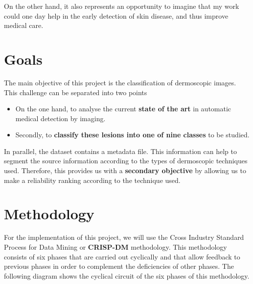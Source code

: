 On the other hand, it also represents an opportunity to imagine that my work could one day help in the early detection of skin disease, and thus improve medical care.



\section{Goals}


The main objective of this project is the classification of dermoscopic images. This challenge can be separated into two points

\begin{itemize}
    \item On the one hand, to analyse the current \textbf{state of the art} in automatic medical detection by imaging.
    \item Secondly, to \textbf{classify these lesions into one of nine classes} to be studied.
\end{itemize}

In parallel, the dataset contains a metadata file. This information can help to segment the source information according to the types of dermoscopic techniques used. Therefore, this provides us with a \textbf{secondary objective} by allowing us to make a reliability ranking according to the technique used. 


\section{Methodology}


For the implementation of this project, we will use the Cross Industry Standard Process for Data Mining or \textbf{CRISP-DM} methodology. This methodology consists of six phases that are carried out cyclically and that allow feedback to previous phases in order to complement the deficiencies of other phases. The following diagram shows the cyclical circuit of the six phases of this methodology.

